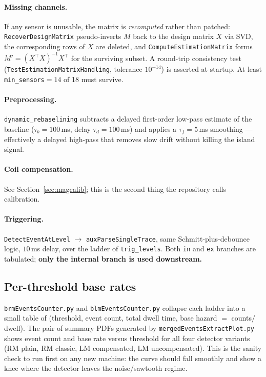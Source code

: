\documentclass[11pt,a4paper]{article}
\newcommand{\code}[1]{\texttt{\small #1}}
\begin{document}
\paragraph{Missing channels.} If any sensor is unusable, the matrix is \emph{recomputed} rather than
patched: \code{RecoverDesignMatrix} pseudo-inverts $M$ back to the design matrix $X$ via SVD, the
corresponding rows of $X$ are deleted, and \code{ComputeEstimationMatrix} forms
$M' = (X^{\!\top}X)^{-1}X^{\!\top}$ for the surviving subset. A round-trip consistency test
(\code{TestEstimationMatrixHandling}, tolerance $10^{-14}$) is asserted at startup. At least
\code{min\_sensors}$=14$ of 18 must survive.

\paragraph{Preprocessing.} \code{dynamic\_rebaselining} subtracts a delayed first-order low-pass
estimate of the baseline ($\tau_b = 100$\,ms, delay $\tau_d = 100$\,ms) and applies a $\tau_f=5$\,ms
smoothing --- effectively a delayed high-pass that removes slow drift without killing the island
signal.

\paragraph{Coil compensation.} See Section~\ref{sec:magcalib}; this is the second thing the
repository calls calibration.

\paragraph{Triggering.} \code{DetectEventAtLevel} $\rightarrow$ \code{auxParseSingleTrace}, same
Schmitt-plus-debounce logic, $10$\,ms delay, over the ladder of \code{trig\_levels}. Both
\code{in} and \code{ex} branches are tabulated; \textbf{only the internal branch is used downstream.}

\subsection{Per-threshold base rates}

\code{brmEventsCounter.py} and \code{blmEventsCounter.py} collapse each ladder into a small table
of (threshold, event count, total dwell time, base hazard $=$ counts$/$dwell). The pair of summary
PDFs generated by \code{mergedEventsExtractPlot.py} shows event count and base rate versus
threshold for all four detector variants (RM plain, RM classic, LM compensated, LM uncompensated).
This is the sanity check to run first on any new machine: the curve should fall smoothly and show a
knee where the detector leaves the noise/sawtooth regime.
\end{document}
